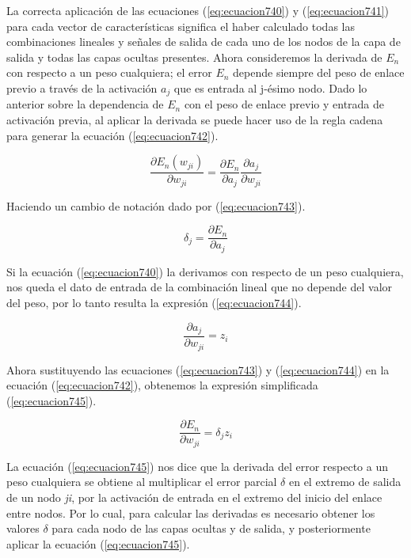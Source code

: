 {La correcta aplicación de las ecuaciones (\ref{eq:ecuacion740}) y (\ref{eq:ecuacion741}) para cada vector de características significa el haber calculado todas las combinaciones lineales y señales de salida de cada uno de 
los nodos de la capa de salida y todas las capas ocultas presentes. Ahora consideremos la derivada de \textit{$E_n$} con respecto a un peso cualquiera; el error \textit{$E_n$} depende siempre del peso de enlace previo a través 
de la activación \textit{$a_j$} que es entrada al j-ésimo nodo. Dado lo anterior sobre la dependencia de \textit{$E_n$} con el peso de enlace previo y entrada de activación previa, al aplicar la derivada se puede hacer uso de 
la regla cadena para generar la ecuación (\ref{eq:ecuacion742}).

\begin{equation}
	\frac{\partial{E_n (w_{ji})}}{\partial{w_{ji}}}=\frac{\partial{E_n}}{\partial{a_{j}}} \frac{\partial{a_j}}{\partial{w_{ji}}}
	\label{eq:ecuacion742}
\end{equation}

Haciendo un cambio de notación dado por (\ref{eq:ecuacion743}).

\begin{equation}
	\delta_{j}=\frac{\partial{E_n}}{\partial{a_{j}}}
	\label{eq:ecuacion743}
\end{equation}

Si la ecuación (\ref{eq:ecuacion740}) la derivamos con respecto de un peso cualquiera, nos queda el dato de entrada de la combinación lineal que no depende del valor del peso, por lo tanto resulta la expresión (\ref{eq:ecuacion744}).

\begin{equation}
	\frac{\partial{a_j}}{\partial{w_{ji}}}=z_i
	\label{eq:ecuacion744}
\end{equation}

Ahora sustituyendo las ecuaciones (\ref{eq:ecuacion743}) y (\ref{eq:ecuacion744}) en la ecuación (\ref{eq:ecuacion742}), obtenemos la expresión simplificada (\ref{eq:ecuacion745}).

\begin{equation}
	\frac{\partial{E_n}}{\partial{w_{ji}}}=\delta_{j} z_i
	\label{eq:ecuacion745}
\end{equation}

La ecuación (\ref{eq:ecuacion745}) nos dice que la derivada del error respecto a un peso cualquiera se obtiene al multiplicar el error parcial \textit{$\delta$} en el extremo de salida de un nodo \textit{ji}, por la activación de entrada 
en el extremo del inicio del enlace entre nodos. Por lo cual, para calcular las derivadas es necesario obtener los valores $\delta$ para cada nodo de las capas ocultas y de salida, y posteriormente aplicar la ecuación (\ref{eq:ecuacion745}).

}
